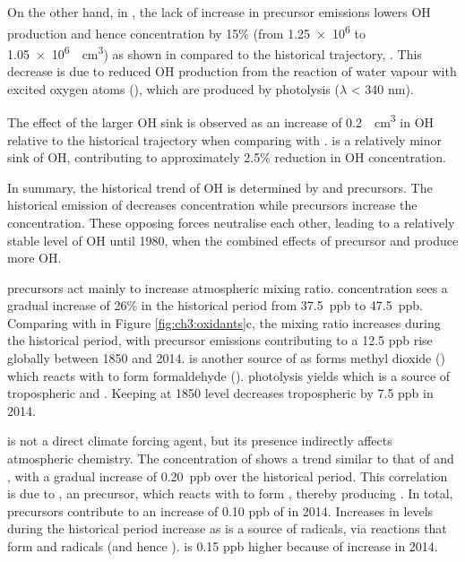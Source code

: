 On the other hand, in \sstpio{}, the lack of increase in  precursor emissions lowers OH production and hence concentration by 15\% (from \num{1.25e6} to \qty{1.05e6}{\per\centi\metre\cubed}) as shown in \sstpio{} compared to the historical trajectory, \histsst{}. This decrease is due to reduced OH production from the reaction of water vapour with excited oxygen atoms (), which are produced by  photolysis ($\lambda$ < 340 nm). 

The effect of the larger OH sink is observed as an increase of \qty{0.2}{\per\centi\metre\cubed} in OH relative to the historical trajectory when comparing \histsst{} with \sstpiaer{}.  is a relatively minor sink of OH, contributing to approximately 2.5\% reduction in OH concentration.

In summary, the historical trend of OH is determined by  and  precursors. The historical emission of  decreases  concentration while  precursors increase the  concentration. These opposing forces neutralise each other, leading to a relatively stable level of OH until 1980, when the combined effects of  precursor and  produce more OH.


 precursors act mainly to increase atmospheric  mixing ratio.  concentration sees a gradual increase of 26\% in the historical period from \qty{37.5}{ppb} to \qty{47.5}{ppb}. Comparing \histsst{} with \sstpio{} in Figure \ref{fig:ch3:oxidants}c, the  mixing ratio increases during the historical period, with  precursor emissions contributing to a 12.5 ppb rise globally between 1850 and 2014.  is another source of  as  forms methyl dioxide () which reacts with  to form formaldehyde ().  photolysis yields  which is a source of tropospheric  and . Keeping  at 1850 level decreases tropospheric  by 7.5 ppb in 2014. 


 is not a direct climate forcing agent, but its presence indirectly affects atmospheric chemistry. The concentration of  shows a trend similar to that of  and , with a gradual increase of \qty{0.20}{ppb} over the historical period. This correlation is due to , an  precursor, which reacts with  to form , thereby producing . In total,  precursors contribute to an increase of 0.10 ppb of  in 2014. Increases in  levels during the historical period increase  as  is a source of  radicals, via reactions that form  and  radicals (and hence ).  is 0.15 ppb higher because of  increase in 2014.



